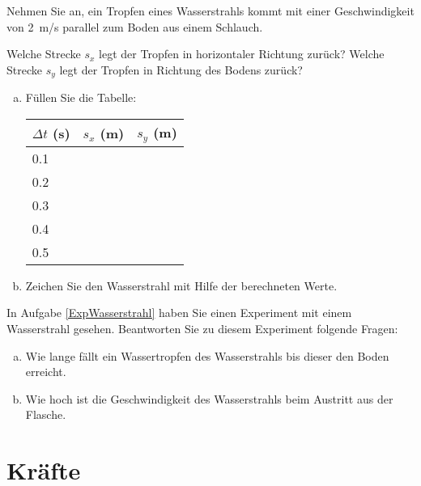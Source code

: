 \documentclass[12pt,a4paper,twoside]{article}
\def\dir{./Aufgaben_Mechanik/}
\newcommand{\Einbinden}[1]{}
\begin{document}
\begin{aufgabe}
	Nehmen Sie an, ein Tropfen eines Wasserstrahls kommt mit einer Geschwindigkeit von \SI{2}{m/s}
	parallel zum Boden aus einem Schlauch.

	Welche Strecke $s_x$ legt der Tropfen in horizontaler Richtung zurück?
	Welche Strecke $s_y$ legt der Tropfen in Richtung des Bodens zurück?

	\begin{enumerate} [a)]
		\item	Füllen Sie die Tabelle:

	\begin{tabular}{p{4cm}|p{4cm}|p{4cm}}
			$\Delta t$ (s) & $s_x$ (m) & $s_y$ (m)\\\hline
			\num{0.1} & & \\
			\num{0.2} & & \\
			\num{0.3} & & \\
			\num{0.4} & & \\
			\num{0.5} & & \\
		\end{tabular}

	\item Zeichen Sie den Wasserstrahl mit Hilfe der berechneten Werte.
	
	\end{enumerate}
\end{aufgabe}

\newpage

\begin{aufgabe}
	In Aufgabe \ref{ExpWasserstrahl} haben Sie einen Experiment mit einem Wasserstrahl gesehen.
	Beantworten Sie zu diesem Experiment folgende Fragen:
	\begin{enumerate}[a)]
		\item	Wie lange fällt ein Wassertropfen des Wasserstrahls bis dieser den Boden erreicht.
		\item	Wie hoch ist die Geschwindigkeit des Wasserstrahls beim Austritt aus der Flasche.
	\end{enumerate}
\end{aufgabe}


\Einbinden{\dir/beschleunigung03.tex}
\Einbinden{\dir/bew3d01.tex}

\newpage
\section{Kräfte}
\Einbinden{\dir/vektoren01.tex}
\Einbinden{\dir/vektoren02.tex}
\Einbinden{\dir/vektoren03.tex}
\Einbinden{\dir/vektoren04.tex}
\end{document}
